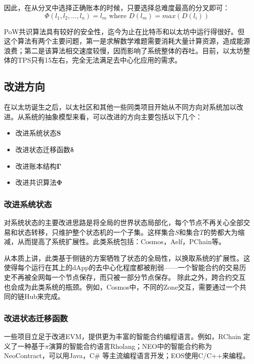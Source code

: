 \documentclass[UTF8,nofonts]{ctexart}
\begin{document}
\begin{multicols}{2}
因此，在从分叉中选择正确账本的时候，只要选择总难度最高的分叉即可：
\begin{equation}
 \Phi (l_{1}, l_{2}, ..., l_{n}) = l_{m} \text{ where } D(l_{m}) = max(D(l_{i}))
\end{equation}

PoW共识算法具有较好的安全性，迄今为止在比特币和以太坊中运行得很好。但这个算法有两个主要问题，第一是求解数学难题需要消耗大量计算资源，造成能源浪费；第二是该算法相交速度较慢，因而影响了系统整体的吞吐。目前，以太坊整体的TPS只有15左右，完全无法满足去中心化应用的需求。

\subsection{改进方向}
在以太坊诞生之后，以太社区和其他一些同类项目开始从不同方向对系统加以改进。从系统的抽象模型来看，可以改进的方向主要包括以下几个：
\begin{itemize}
	\item 改进系统状态$\boldsymbol{S}$	
	\item 改进状态迁移函数$\boldsymbol{\delta}$	
	\item 改进账本结构$\boldsymbol{\Gamma}$
	\item 改进共识算法$\boldsymbol{\Phi}$
\end{itemize}

\subsubsection{改进系统状态}
对系统状态的主要改进思路是将全局的世界状态局部化，每个节点不再关心全部交易和状态转移，只维护整个状态机的一个子集。这样集合$S$和集合$T$的势都大为缩减，从而提高了系统扩展性。此类系统包括：Cosmos\cite{cosmos}，Aelf\cite{aelf}，PChain等。

从本质上讲，此类基于侧链的方案牺牲了状态的全局性，以换取系统的扩展性。这使得每个运行在其上的dApp的去中心化程度都被削弱——一个智能合约的交易历史不再被全网每一个节点保存，而只被一部分节点保存。
除此之外，跨合约交互也会成为此类系统的瓶颈。例如，Cosmos中，不同的Zone交互，需要通过一个共同的链Hub来完成\cite{cosmos}。

\subsubsection{改进状态迁移函数}
一些项目立足于改进EVM，提供更为丰富的智能合约编程语言。例如，RChain	定义了一种基于$\pi$演算的智能合约语言Rholang；NEO中的智能合约称为NeoContract，可以用Java，C\# 等主流编程语言开发；EOS使用C/C++来编程。


\end{multicols}
\end{document}
